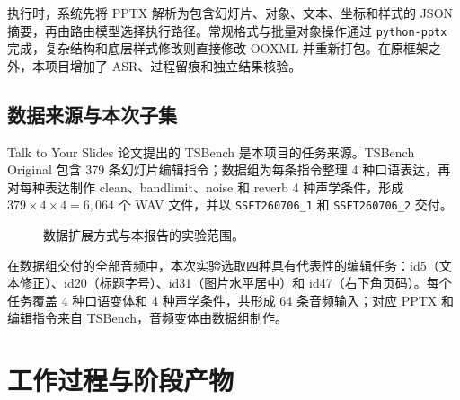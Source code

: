 \documentclass[11pt,a4paper,UTF8,fontset=fandol]{ctexart}
\begin{document}
执行时，系统先将 PPTX 解析为包含幻灯片、对象、文本、坐标和样式的 JSON 摘要，再由路由模型选择执行路径。常规格式与批量对象操作通过 \texttt{python-pptx} 完成，复杂结构和底层样式修改则直接修改 OOXML 并重新打包。在原框架之外，本项目增加了 ASR、过程留痕和独立结果核验。

\subsection{数据来源与本次子集}

Talk to Your Slides 论文提出的 TSBench 是本项目的任务来源。TSBench Original 包含 379 条幻灯片编辑指令；数据组为每条指令整理 4 种口语表达，再对每种表达制作 clean、bandlimit、noise 和 reverb 4 种声学条件，形成 $379\times4\times4=6{,}064$ 个 WAV 文件，并以 \texttt{SSFT260706\_1} 和 \texttt{SSFT260706\_2} 交付。

\begin{figure}[H]
\centering
{}
\caption{数据扩展方式与本报告的实验范围。}
\end{figure}

在数据组交付的全部音频中，本次实验选取四种具有代表性的编辑任务：id5（文本修正）、id20（标题字号）、id31（图片水平居中）和 id47（右下角页码）。每个任务覆盖 4 种口语变体和 4 种声学条件，共形成 64 条音频输入；对应 PPTX 和编辑指令来自 TSBench，音频变体由数据组制作。

\section{工作过程与阶段产物}
\end{document}
